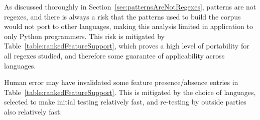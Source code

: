 As discussed thoroughly in Section~\ref{sec:patternsAreNotRegexes}, patterns are not regexes, and there is always a risk that the patterns used to build the corpus would not port to other languages, making this analysis limited in application to only Python programmers.  This risk is mitigated by Table~\ref{table:rankedFeatureSupport}, which proves a high level of portability for all regexes studied, and therefore some guarantee of applicability across languages.

Human error may have invalidated some feature presence/absence entries in Table~\ref{table:rankedFeatureSupport}.  This is mitigated by the choice of languages, selected to make initial testing relatively fast, and re-testing by outside parties also relatively fast.

